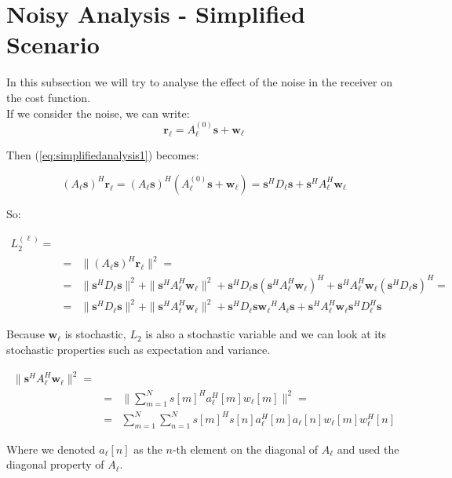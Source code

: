 \section{Noisy Analysis - Simplified Scenario}
In this subsection we will try to analyse the effect of the noise in the receiver on the
cost function.
\\

If we consider the noise, we can write: $$ \mathbf{r_\ell}=A^{(0)}_\ell \mathbf{s}+\mathbf{w_\ell}$$

Then (\ref{eq:simplifiedanalysis1}) becomes:

\begin{equation}
(A_\ell\mathbf{s})^H\mathbf{r_\ell}=(A_\ell\mathbf{s})^H(A^{(0)}_\ell \mathbf{s}+\mathbf{w_\ell})=\mathbf{s}^H D_\ell \mathbf{s}+ \mathbf{s}^H A_\ell^H \mathbf{w_\ell}
\end{equation}

So:

\begin{eqnarray}
\label{eq:three_eight}
L_2^{(\ell)}= \\
&=& \|(A_\ell\mathbf{s})^H\mathbf{r_\ell}\|^2 = \nonumber\\ 
&=&\|\mathbf{s}^H D_\ell \mathbf{s}\|^2+\|\mathbf{s}^H A_\ell^H \mathbf{w_\ell}\|^2 + \mathbf{s}^H D_\ell \mathbf{s}(\mathbf{s}^H A_\ell^H \mathbf{w_\ell})^H + \mathbf{s}^H A_\ell^H \mathbf{w_\ell}(\mathbf{s}^H D_\ell \mathbf{s})^H = 
\nonumber \\ 
&=& \|\mathbf{s}^H D_\ell \mathbf{s}\|^2+\|\mathbf{s}^H A_\ell^H \mathbf{w_\ell}\|^2 + \mathbf{s}^H D_\ell \mathbf{s}\mathbf{w_\ell}^H A_\ell \mathbf{s} + \mathbf{s}^H A_\ell ^H \mathbf{w_\ell}\mathbf{s}^H D_\ell^H \mathbf{s} \nonumber
\end{eqnarray}

Because $\mathbf{w_\ell}$ is stochastic, $L_2$ is also a stochastic variable and we can look at its
stochastic properties such as expectation and variance.

\begin{eqnarray}
\|\mathbf{s}^H A_\ell^H \mathbf{w_\ell}\|^2 = \\
&=& \| \sum_{m=1}^N{s[m]^H a_\ell^H[m] w_\ell[m]}\|^2 = \nonumber \\
&=&\sum_{m=1}^N\sum_{n=1}^N s[m]^H s[n] a_\ell^H[m] a_\ell[n] w_\ell[m] w_\ell^H[n] \nonumber
\end{eqnarray}

Where we denoted $a_\ell[n]$ as the $n$-th element on the diagonal of $A_\ell$ and used the diagonal property of $A_\ell$.\\

